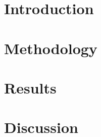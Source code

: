 \documentclass[12pt,a4paper]{article}
\begin{document}
\section{Introduction}
\label{sec:introduction}

\newpage

\section{Methodology}
\label{sec:methodology}

\newpage

\section{Results}
\label{sec:results}

\newpage

\section{Discussion}
\label{sec:discussion}

\newpage

\printbibliography[heading=bibintoc]
\end{document}
